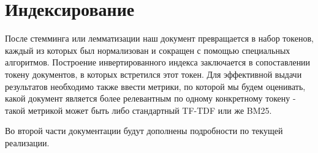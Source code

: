 \section{Индексирование}
После стемминга или лемматизации наш документ превращается в набор токенов, каждый из которых был 
нормализован и сокращен с помощью специальных алгоритмов. Построение инвертированного индекса заключается 
в сопоставлении токену документов, в которых встретился этот токен. Для эффективной выдачи результатов 
необходимо также ввести метрики, по которой мы будем оценивать, какой документ является более релевантным 
по одному конкретному токену - такой метрикой может быть либо стандартный TF-TDF или же BM25. 

\vspace{15pt}
\noindent Во второй части документации будут дополнены подробности по текущей реализации.